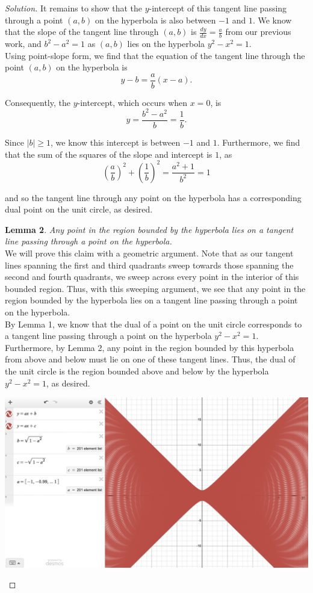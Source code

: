 \documentclass[11pt]{article}
\newenvironment{solution}
  {\renewcommand\qedsymbol{$\blacksquare$}\begin{proof}[Solution]}
  {\end{proof}}
\begin{document}
\begin{enumerate}
\begin{solution}
It remains to show that the $y$-intercept of this tangent line passing through a point $(a,b)$ on the hyperbola is also between $-1$ and $1$. We know that the slope of the tangent line through $(a, b)$ is $\frac{dy}{dx} = \frac{a}{b}$ from our previous work, and $b^2 - a^2 = 1$ as $(a, b)$ lies on the hyperbola $y^2-x^2=1$. \\

Using point-slope form, we find that the equation of the tangent line through the point $(a, b)$ on the hyperbola is
\[ y - b = \frac{a}{b}(x-a). \]

Consequently, the $y$-intercept, which occurs when $x=0$, is \[ y = \frac{b^2-a^2}{b} = \frac{1}{b}.\]

Since $|b| \geq 1$, we know this intercept is between $-1$ and $1$. Furthermore, we find that the sum of the squares of the slope and intercept is $1$, as \[ \left(\frac{a}{b}\right)^2 + \left(\frac{1}{b}\right)^2 = \frac{a^2+1}{b^2} = 1\]

and so the tangent line through any point on the hyperbola has a corresponding dual point on the unit circle, as desired.

\textbf{Lemma 2}. \textit{Any point in the region bounded by the hyperbola lies on a tangent line passing through a point on the hyperbola.} \\

We will prove this claim with a geometric argument. Note that as our tangent lines spanning the first and third quadrants sweep towards those spanning the second and fourth quadrants, we sweep across every point in the interior of this bounded region. Thus, with this sweeping argument, we see that any point in the region bounded by the hyperbola lies on a tangent line passing through a point on the hyperbola. \\

By Lemma 1, we know that the dual of a point on the unit circle corresponds to a tangent line passing through a point on the hyperbola $y^2-x^2 = 1$. Furthermore, by Lemma 2, any point in the region bounded by this hyperbola from above and below must lie on one of these tangent lines. Thus, the dual of the unit circle is the region bounded above and below by the hyperbola $y^2-x^2 = 1$, as desired. \\

\begin{center}
\includegraphics[scale=0.2]{images/HW8/part_1_desmos.png}
\end{center}


\end{solution}
\end{enumerate}
\end{document}
